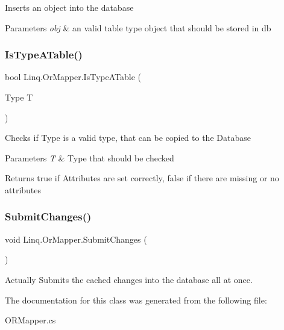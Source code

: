 Inserts an object into the database 


\begin{DoxyParams}{Parameters}
{\em obj} & an valid table type object that should be stored in db\\
\hline
\end{DoxyParams}
\mbox{\label{class_linq_1_1_or_mapper_a9fb4865eedaba32daf32f65874779a60}} 
\subsubsection{\texorpdfstring{Is\+Type\+A\+Table()}{IsTypeATable()}}
{\footnotesize\ttfamily bool Linq.\+Or\+Mapper.\+Is\+Type\+A\+Table (\begin{DoxyParamCaption}\item[{Type}]{T }\end{DoxyParamCaption})\hspace{0.3cm}{\ttfamily [inline]}}



Checks if Type is a valid type, that can be copied to the Database 


\begin{DoxyParams}{Parameters}
{\em T} & Type that should be checked\\
\hline
\end{DoxyParams}
\begin{DoxyReturn}{Returns}
true if Attributes are set correctly, false if there are missing or no attributes
\end{DoxyReturn}
\mbox{\label{class_linq_1_1_or_mapper_a447b6b90b25be80634149e945c686461}} 
\subsubsection{\texorpdfstring{Submit\+Changes()}{SubmitChanges()}}
{\footnotesize\ttfamily void Linq.\+Or\+Mapper.\+Submit\+Changes (\begin{DoxyParamCaption}{ }\end{DoxyParamCaption})\hspace{0.3cm}{\ttfamily [inline]}}



Actually Submits the cached changes into the database all at once. 



The documentation for this class was generated from the following file\+:\begin{DoxyCompactItemize}
\item 
O\+R\+Mapper.\+cs\end{DoxyCompactItemize}
